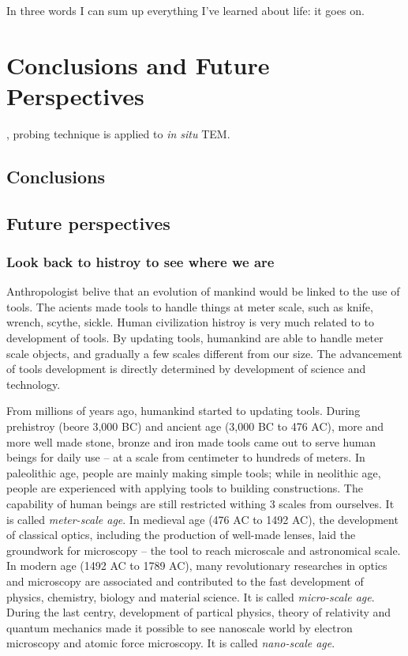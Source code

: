 
\begin{savequote}[75mm] 
In three words I can sum up everything I've learned about life: it goes on.
\end{savequote}

\chapter{Conclusions and Future Perspectives}

, probing technique is applied to \emph{in situ} TEM.

\section{Conclusions}

\section{Future perspectives}
\subsection{Look back to histroy to see where we are}
Anthropologist belive that an evolution of mankind would be linked to the use of tools. \cite{lilley1948men} The acients made tools to handle things at meter scale, such as knife, wrench, scythe, sickle. Human civilization histroy is very much related to to development of tools. By updating tools, humankind are able to handle meter scale objects, and gradually a few scales different from our size. The advancement of tools development is directly determined by development of science and technology. 

From millions of years ago, humankind started to updating tools. During prehistroy (beore 3,000 BC) and ancient age (3,000 BC to 476 AC), more and more well made stone, bronze and iron made tools came out to serve human beings for daily use -- at a scale from centimeter to hundreds of meters. In paleolithic age, people are mainly making simple tools; while in neolithic age, people are experienced with applying tools to building constructions. The capability of human beings are still restricted withing 3 scales from ourselves. It is called {\em meter-scale age}. 
In medieval age (476 AC to 1492 AC), the development of classical optics, including the production of well-made lenses, laid the groundwork for microscopy -- the tool to reach microscale and astronomical scale. In modern age (1492 AC to 1789 AC), many revolutionary researches in optics and microscopy are associated and contributed to the fast development of physics, chemistry, biology and material science. It is called {\em micro-scale age}. 
During the last centry, development of partical physics, theory of relativity and quantum mechanics made it possible to see nanoscale world by electron microscopy and atomic force microscopy. It is called {\em nano-scale age}.

